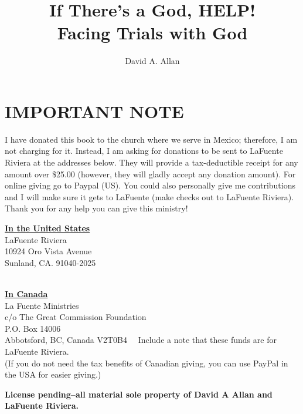 \documentclass[oneside]{book}
\begin{document}
%

\frontmatter
\title{If There's a God, HELP!\\
	\large Facing Trials with God
}
\author{David A. Allan}
\maketitle
\chapter{IMPORTANT NOTE}
I have donated this book to the church where we serve in Mexico; therefore, I am not charging for it. Instead, I am asking for donations to be sent to LaFuente Riviera at the addresses below. They will provide a tax-deductible receipt for any amount over \$25.00 (however, they will gladly accept any donation amount). For online giving go to Paypal (US). You could also personally give me contributions and I will make sure it gets to LaFuente (make checks out to LaFuente Riviera). Thank you for any help you can give this ministry!\\

\begin{center}
\underline{\textbf{In the United States}}\\
LaFuente Riviera\\
10924 Oro Vista Avenue\\
Sunland, CA. 91040-2025\\
\
\

\underline{\textbf{In Canada}}\\
La Fuente Ministries\\
c/o The Great Commission Foundation\\
P.O. Box 14006\\
Abbotsford, BC, Canada V2T0B4
\
\
Include a note that these funds are for LaFuente Riviera.\\
(If you do not need the tax benefits of Canadian giving, you can use PayPal in the USA for easier giving.)
\end{center}
\textbf{License pending--all material sole property of David A Allan and LaFuente Riviera.}
\end{document}
